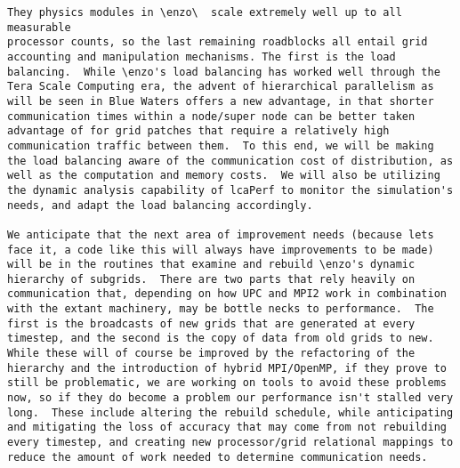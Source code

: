 \documentclass{article}
\begin{document}
\begin{verbatim}
They physics modules in \enzo\  scale extremely well up to all measurable
processor counts, so the last remaining roadblocks all entail grid
accounting and manipulation mechanisms. The first is the load
balancing.  While \enzo's load balancing has worked well through the
Tera Scale Computing era, the advent of hierarchical parallelism as
will be seen in Blue Waters offers a new advantage, in that shorter
communication times within a node/super node can be better taken
advantage of for grid patches that require a relatively high
communication traffic between them.  To this end, we will be making
the load balancing aware of the communication cost of distribution, as
well as the computation and memory costs.  We will also be utilizing
the dynamic analysis capability of lcaPerf to monitor the simulation's
needs, and adapt the load balancing accordingly.

We anticipate that the next area of improvement needs (because lets
face it, a code like this will always have improvements to be made)
will be in the routines that examine and rebuild \enzo's dynamic
hierarchy of subgrids.  There are two parts that rely heavily on
communication that, depending on how UPC and MPI2 work in combination
with the extant machinery, may be bottle necks to performance.  The
first is the broadcasts of new grids that are generated at every
timestep, and the second is the copy of data from old grids to new.
While these will of course be improved by the refactoring of the
hierarchy and the introduction of hybrid MPI/OpenMP, if they prove to
still be problematic, we are working on tools to avoid these problems
now, so if they do become a problem our performance isn't stalled very
long.  These include altering the rebuild schedule, while anticipating
and mitigating the loss of accuracy that may come from not rebuilding
every timestep, and creating new processor/grid relational mappings to
reduce the amount of work needed to determine communication needs.
\end{verbatim}

\end{document}
